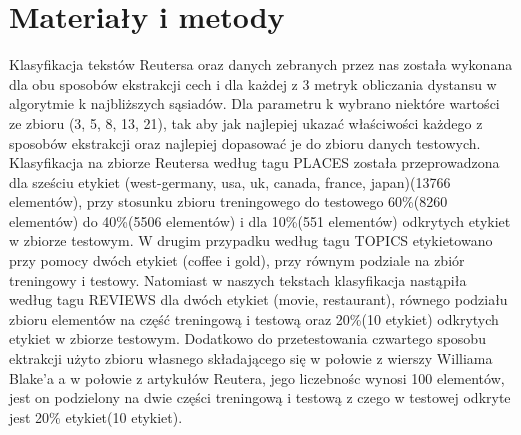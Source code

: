 \documentclass{classrep}
\begin{document}
\section{Materiały i metody}
Klasyfikacja tekstów Reutersa oraz danych zebranych przez nas została wykonana dla obu sposobów ekstrakcji cech i dla każdej z 3 metryk obliczania dystansu w algorytmie k najbliższych sąsiadów. Dla parametru k wybrano niektóre wartości ze zbioru (3, 5, 8, 13, 21), tak aby jak najlepiej ukazać właściwości każdego z sposobów ekstrakcji oraz najlepiej dopasować je do zbioru danych testowych. Klasyfikacja na zbiorze Reutersa według tagu PLACES została przeprowadzona dla sześciu etykiet (west-germany, usa, uk, canada, france, japan)(13766 elementów), przy stosunku zbioru treningowego do testowego 60\%(8260 elementów) do 40\%(5506 elementów) i dla 10\%(551 elementów) odkrytych etykiet w zbiorze testowym. W drugim przypadku według tagu TOPICS etykietowano przy pomocy dwóch etykiet (coffee i gold), przy równym podziale na zbiór treningowy i testowy. Natomiast w naszych tekstach klasyfikacja nastąpiła według tagu REVIEWS dla dwóch etykiet (movie, restaurant), równego podziału zbioru elementów na część treningową i testową oraz 20\%(10 etykiet) odkrytych etykiet w zbiorze testowym. Dodatkowo do przetestowania czwartego sposobu ektrakcji użyto zbioru własnego składającego się w połowie z wierszy Williama Blake'a a w połowie z artykułów Reutera, jego liczebnośc wynosi 100 elementów, jest on podzielony na dwie części treningową i testową z czego w testowej odkryte jest 20\% etykiet(10 etykiet).
\end{document}
